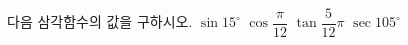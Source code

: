 다음 삼각함수의 값을 구하시오.
 $\sin 15^\circ$
 $\cos\dfrac{\pi}{12}$
 $\tan\dfrac{5}{12}\pi$
 $\sec 105^\circ$
